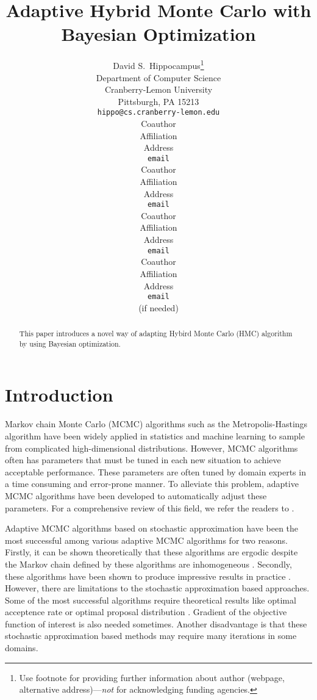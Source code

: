 \documentclass{article} %
\title{Adaptive Hybrid Monte Carlo with Bayesian Optimization}
\author{
David S.~Hippocampus\thanks{ Use footnote for providing further information
about author (webpage, alternative address)---\emph{not} for acknowledging
funding agencies.} \\
Department of Computer Science\\
Cranberry-Lemon University\\
Pittsburgh, PA 15213 \\
\texttt{hippo@cs.cranberry-lemon.edu} \\
\And
Coauthor \\
Affiliation \\
Address \\
\texttt{email} \\
\AND
Coauthor \\
Affiliation \\
Address \\
\texttt{email} \\
\And
Coauthor \\
Affiliation \\
Address \\
\texttt{email} \\
\And
Coauthor \\
Affiliation \\
Address \\
\texttt{email} \\
(if needed)\\
}
\begin{document}
\maketitle

\begin{abstract}
This paper introduces a novel way of adapting Hybird Monte Carlo (HMC) algorithm by using Bayesian optimization. 
\end{abstract}

\section{Introduction}
Markov chain Monte Carlo (MCMC) \cite{andrieu2003introduction} algorithms such as the Metropolis-Hastings algorithm \cite{hastings1970monte, metropolis1953equation} have been widely applied in statistics and machine learning to sample from complicated high-dimensional distributions. However, MCMC algorithms often has parameters that must be tuned in each new situation to achieve acceptable performance. These parameters are often tuned by domain experts in a time consuming and error-prone manner. To alleviate this problem, adaptive MCMC algorithms have been developed to automatically adjust these parameters. For a comprehensive review of this field, we refer the readers to \cite{adaptmcmc_tut,atchade_chap,ex_adaptmcmc}.

Adaptive MCMC algorithms based on stochastic approximation have been the most successful among various adaptive MCMC algorithms for two reasons. Firstly, it can be shown theoretically that these algorithms are ergodic despite the Markov chain defined by these algorithms are inhomogeneous \cite{Andrieu2001,Andrieu2006,Saksman2010}. Secondly, these algorithms have been shown to produce impressive results in practice \cite{Haario2001,Vihola2010}. However, there are limitations to the stochastic approximation based approaches. Some of the most successful algorithms require theoretical results like optimal acceptence rate or optimal proposal distribution \cite{roberts2009examples}. Gradient of the objective function of interest is also needed sometimes. Another disadvantage is that these stochastic approximation based methods may require many iterations in some domains.
\end{document}
